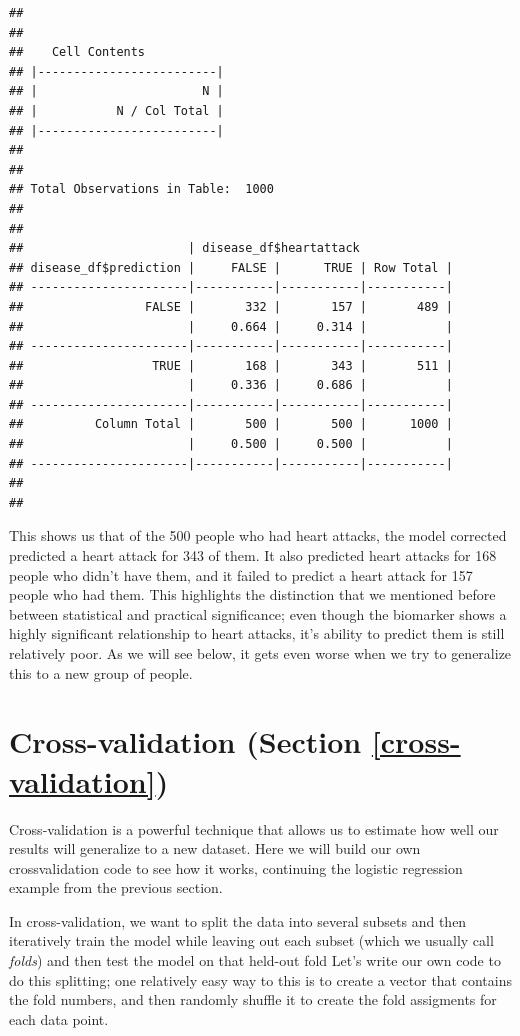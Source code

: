 \documentclass[12pt,]{book}
\begin{document}
\begin{verbatim}
## 
##  
##    Cell Contents
## |-------------------------|
## |                       N |
## |           N / Col Total |
## |-------------------------|
## 
##  
## Total Observations in Table:  1000 
## 
##  
##                       | disease_df$heartattack 
## disease_df$prediction |     FALSE |      TRUE | Row Total | 
## ----------------------|-----------|-----------|-----------|
##                 FALSE |       332 |       157 |       489 | 
##                       |     0.664 |     0.314 |           | 
## ----------------------|-----------|-----------|-----------|
##                  TRUE |       168 |       343 |       511 | 
##                       |     0.336 |     0.686 |           | 
## ----------------------|-----------|-----------|-----------|
##          Column Total |       500 |       500 |      1000 | 
##                       |     0.500 |     0.500 |           | 
## ----------------------|-----------|-----------|-----------|
## 
## 
\end{verbatim}

This shows us that of the 500 people who had heart attacks, the model corrected predicted a heart attack for 343 of them. It also predicted heart attacks for 168 people who didn't have them, and it failed to predict a heart attack for 157 people who had them. This highlights the distinction that we mentioned before between statistical and practical significance; even though the biomarker shows a highly significant relationship to heart attacks, it's ability to predict them is still relatively poor. As we will see below, it gets even worse when we try to generalize this to a new group of people.

\hypertarget{cross-validation-section-refcross-validation}{%
\section{Cross-validation (Section \ref{cross-validation})}\label{cross-validation-section-refcross-validation}}

Cross-validation is a powerful technique that allows us to estimate how well our results will generalize to a new dataset. Here we will build our own crossvalidation code to see how it works, continuing the logistic regression example from the previous section.

In cross-validation, we want to split the data into several subsets and then iteratively train the model while leaving out each subset (which we usually call \emph{folds}) and then test the model on that held-out fold Let's write our own code to do this splitting; one relatively easy way to this is to create a vector that contains the fold numbers, and then randomly shuffle it to create the fold assigments for each data point.
\end{document}
